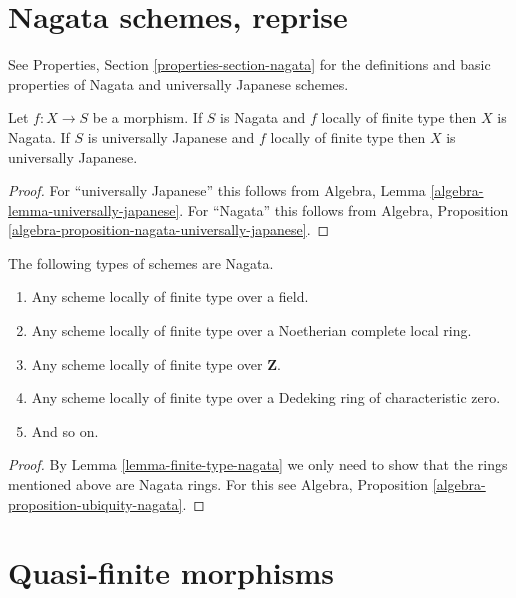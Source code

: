 \section{Nagata schemes, reprise}
\label{section-nagata}

\noindent
See Properties, Section \ref{properties-section-nagata} for the definitions
and basic properties of Nagata and universally Japanese schemes.

\begin{lemma}
\label{lemma-finite-type-nagata}
Let $f : X \to S$ be a morphism.
If $S$ is Nagata and $f$ locally of finite type then $X$ is Nagata.
If $S$ is universally Japanese
and $f$ locally of finite type then $X$ is universally Japanese.
\end{lemma}

\begin{proof}
For ``universally Japanese'' this follows from
Algebra, Lemma \ref{algebra-lemma-universally-japanese}.
For ``Nagata'' this follows from
Algebra, Proposition \ref{algebra-proposition-nagata-universally-japanese}.
\end{proof}

\begin{lemma}
\label{lemma-ubiquity-nagata}
The following types of schemes are Nagata.
\begin{enumerate}
\item Any scheme locally of finite type over a field.
\item Any scheme locally of finite type over a Noetherian complete local ring.
\item Any scheme locally of finite type over $\mathbf{Z}$.
\item Any scheme locally of finite type over a Dedeking ring of
characteristic zero.
\item And so on.
\end{enumerate}
\end{lemma}

\begin{proof}
By Lemma \ref{lemma-finite-type-nagata} we only need to show that
the rings mentioned above are Nagata rings. For this see
Algebra, Proposition \ref{algebra-proposition-ubiquity-nagata}.
\end{proof}




\section{Quasi-finite morphisms}
\label{section-quasi-finite}

